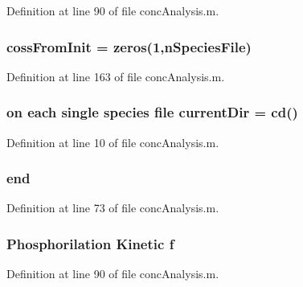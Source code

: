 Definition at line 90 of file conc\-Analysis.\-m.

\hypertarget{a00025_a547b10724f74451f717078739944cc74}{
\subsubsection[{coss\-From\-Init}]{\setlength{\rightskip}{0pt plus 5cm}coss\-From\-Init = zeros(1,n\-Species\-File)}}\label{a00025_a547b10724f74451f717078739944cc74}


Definition at line 163 of file conc\-Analysis.\-m.

\hypertarget{a00025_afb60cd67e28ca8c9fa44e4f5452589b9}{
\subsubsection[{current\-Dir}]{\setlength{\rightskip}{0pt plus 5cm}on each single {\bf species} {\bf file} current\-Dir = {\bf cd}()}}\label{a00025_afb60cd67e28ca8c9fa44e4f5452589b9}


Definition at line 10 of file conc\-Analysis.\-m.

\hypertarget{a00025_afb358f48b1646c750fb9da6c6585be2b}{
\subsubsection[{end}]{\setlength{\rightskip}{0pt plus 5cm}end}}\label{a00025_afb358f48b1646c750fb9da6c6585be2b}


Definition at line 73 of file conc\-Analysis.\-m.

\hypertarget{a00025_a9c5a71c46b1abb8b7df5ebeac6c81535}{
\subsubsection[{f}]{\setlength{\rightskip}{0pt plus 5cm}Phosphorilation Kinetic f}}\label{a00025_a9c5a71c46b1abb8b7df5ebeac6c81535}


Definition at line 90 of file conc\-Analysis.\-m.


